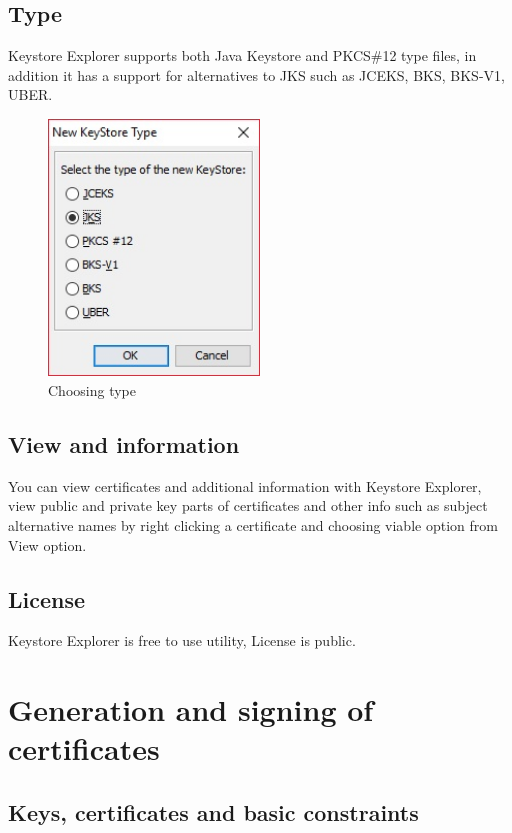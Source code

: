 \documentclass[10pt, a4paper]{report}
\begin{document}
  \subsection{Type}
Keystore Explorer supports both Java Keystore and PKCS\#12 type files, in addition it has a support for alternatives to JKS such as JCEKS, BKS, BKS-V1, UBER.
\begin{figure}[!ht]
 \caption{Choosing type}
 \centering
  \includegraphics[width=0.5\textwidth]{../Dependancies/Keystore_Explorer/Type.jpg}
\end{figure}
  
\subsection{View and information}
You can view certificates and additional information with Keystore Explorer, view public and private key parts of certificates and other info such as subject alternative names by right clicking a certificate and choosing viable option from View option.

  \subsection{License}
Keystore Explorer is free to use utility, License is public.
  
\section{Generation and signing of certificates}

  \subsection{Keys, certificates and basic constraints}
  
\end{document}

